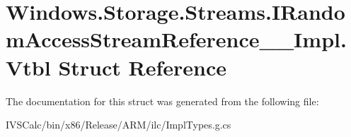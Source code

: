 \hypertarget{struct_windows_1_1_storage_1_1_streams_1_1_i_random_access_stream_reference_____impl_1_1_vtbl}{}\section{Windows.\+Storage.\+Streams.\+I\+Random\+Access\+Stream\+Reference\+\_\+\+\_\+\+Impl.\+Vtbl Struct Reference}
\label{struct_windows_1_1_storage_1_1_streams_1_1_i_random_access_stream_reference_____impl_1_1_vtbl}


The documentation for this struct was generated from the following file\+:\begin{DoxyCompactItemize}
\item 
I\+V\+S\+Calc/bin/x86/\+Release/\+A\+R\+M/ilc/Impl\+Types.\+g.\+cs\end{DoxyCompactItemize}
